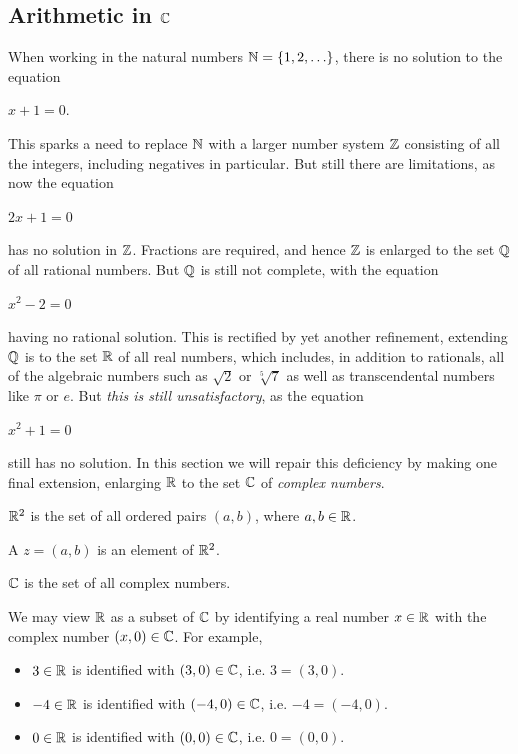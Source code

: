 \documentclass[11pt,fleqn,dvipsnames,usenames]{article}
\newcommand{\p}{\noindent}
\begin{document}
\subsection{Arithmetic in \texorpdfstring{$\mathbb{C}$}{C}}

\p When working in the natural numbers $\mathbb{N} = \left\{1,2,\ldots\right\}$, there is no solution to the equation
\begin{center}
$x + 1 = 0$.
\end{center}
This sparks a need to replace $\mathbb{N}$ with a larger number system $\mathbb{Z}$ consisting of all the integers, including negatives in particular.  But still there are limitations, as now the equation
\begin{center}
$2x + 1 = 0$
\end{center}
has no solution in $\mathbb{Z}$.  Fractions are required, and hence $\mathbb{Z}$ is enlarged to the set $\mathbb{Q}$ of all rational numbers.  But $\mathbb{Q}$ is still not complete, with the equation
\begin{center}
$x^2 - 2 = 0$
\end{center}
having no rational solution.  This is rectified by yet another refinement, extending $\mathbb{Q}$ is to the set $\mathbb{R}$ of all real numbers, which includes, in addition to rationals, all of the algebraic numbers such as $\sqrt{2}$ or $\sqrt[5]{7}$ as well as transcendental numbers like $\pi$ or $e$.  But \emph{this is still unsatisfactory}, as the equation
\begin{center}
$x^2 + 1 = 0$
\end{center}
still has no solution.  In this section we will repair this deficiency by making one final extension, enlarging $\mathbb{R}$ to the set $\mathbb{C}$ of \emph{complex numbers}.
\vsp

\recall $\mathbb{R}^{2}$ is the set of all ordered pairs $(a,b)$, where $a,b\in\mathbb{R}$.

\begin{definition}
A  $z = (a,b)$ is an element of $\mathbb{R}^{2}$.
\end{definition}

\notation $\mathbb{C}$ is the set of all complex numbers.
\vsp

\begin{remark}
We may view $\mathbb{R}$ as a subset of $\mathbb{C}$ by identifying a real number $x\in\mathbb{R}$ with the complex number $(x,0)\in\mathbb{C}$.  For example,
\begin{itemize}
\item $3\in\mathbb{R}$ is identified with $(3,0)\in\mathbb{C}$, i.e. $3 = (3,0)$.
\item $-4\in\mathbb{R}$ is identified with $(-4,0)\in\mathbb{C}$, i.e. $-4 = (-4,0)$.
\item $0\in\mathbb{R}$ is identified with $(0,0)\in\mathbb{C}$, i.e. $0 = (0,0)$.
\end{itemize}
\end{remark}
\end{document}
